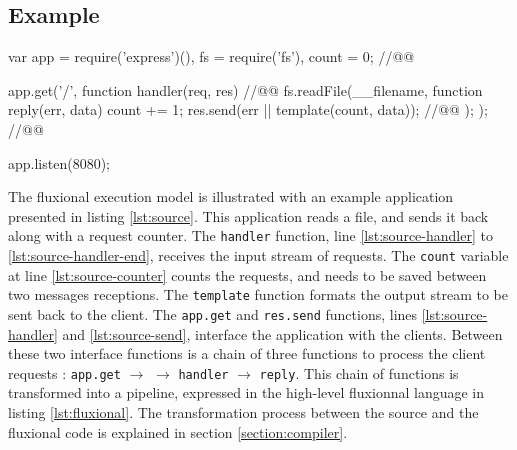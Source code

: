 \subsection{Example}

\begin{code}[js,
  caption={Example web application},
  label={lst:source}]
var app = require('express')(),
    fs = require('fs'),
    count = 0; //@\label{lst:source-counter}@

app.get('/', function handler(req, res){ //@\label{lst:source-handler}@
  fs.readFile(__filename, function reply(err, data) {
    count += 1;
    res.send(err || template(count, data)); //@\label{lst:source-send}@
  });
}); //@\label{lst:source-handler-end}@

app.listen(8080);
\end{code}

The fluxional execution model is illustrated with an example application presented in listing \ref{lst:source}.
This application reads a file, and sends it back along with a request counter.
The \texttt{handler} function, line \ref{lst:source-handler} to \ref{lst:source-handler-end}, receives the input stream of requests.
The \texttt{count} variable at line \ref{lst:source-counter} counts the requests, and needs to be saved between two messages receptions.
The \texttt{template} function formats the output stream to be sent back to the client.
The \texttt{app.get} and \texttt{res.send} functions, lines \ref{lst:source-handler} and \ref{lst:source-send}, interface the application with the clients.
Between these two interface functions is a chain of three functions to process the client requests : \texttt{app.get} $\to$ \hspace{-1.4em} $\to$ \texttt{handler} $\to$ \texttt{reply}.
This chain of functions is transformed into a pipeline, expressed in the high-level fluxionnal language in listing \ref{lst:fluxional}.
The transformation process between the source and the fluxional code is explained in section \ref{section:compiler}.

